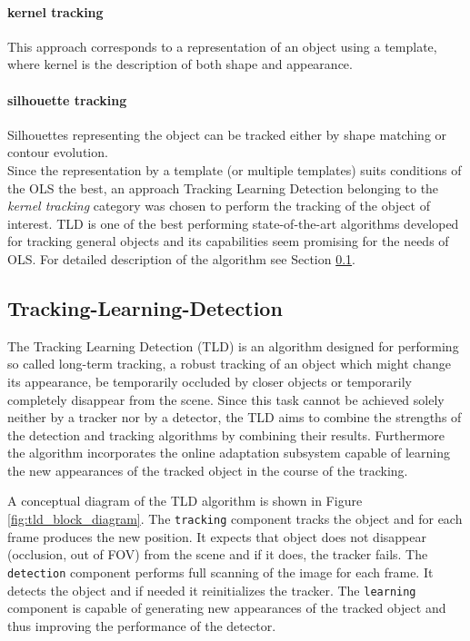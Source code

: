 \paragraph{kernel tracking} 
This approach corresponds to a representation of an object using a template, where kernel is the description of both shape and appearance.

\paragraph{silhouette tracking}
Silhouettes representing the object can be tracked either by shape matching or contour evolution. \\

Since the representation by a template (or multiple templates) suits conditions of the OLS the best, an approach Tracking Learning Detection belonging to the \textit{kernel tracking} category was chosen to perform the tracking of the object of interest. TLD is one of the best performing state-of-the-art algorithms developed for tracking general objects and its capabilities seem promising for the needs of OLS. For detailed description of the algorithm see Section \ref{txt:tracking_learning_detection}.

\subsection{Tracking-Learning-Detection} \label{txt:tracking_learning_detection}

The Tracking Learning Detection (TLD) \cite{Kalal:2012:TRA:2225045.2225082} is an algorithm designed for performing so called long-term tracking, a robust tracking of an object which might change its appearance, be temporarily occluded by closer objects or temporarily completely disappear from the scene. Since this task cannot be achieved solely neither by a tracker nor by a detector, the TLD aims to combine the strengths of the detection and tracking algorithms by combining their results. Furthermore the algorithm incorporates the online adaptation subsystem capable of learning the new appearances of the tracked object in the course of the tracking.

A conceptual diagram of the TLD algorithm is shown in Figure \ref{fig:tld_block_diagram}. The \texttt{tracking} component tracks the object and for each frame produces the new position. It expects that object does not disappear (occlusion, out of FOV) from the scene and if it does, the tracker fails. The \texttt{detection} component performs full scanning of the image for each frame. It detects the object and if needed it reinitializes the tracker. The \texttt{learning} component is capable of generating new appearances of the tracked object and thus improving the performance of the detector. 


